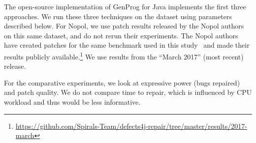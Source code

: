 \documentclass[conference]{IEEEtran}
\begin{document}
The open-source implementation of GenProg for
Java implements  
the first three approaches.   We run these three techniques on the dataset using
parameters described below.  For Nopol, we use patch results released
by the Nopol authors on this same dataset, and do not rerun their experiments.
The Nopol authors have created patches for the same benchmark used in
this study~\cite{martinez2016} and made their results publicly
available.\footnote{\url{https://github.com/Spirals-Team/defects4j-repair/tree/master/results/2017-march}}
We use results from the ``March 2017'' (most recent) release. 

For the comparative experiments, we look at expressive power (bugs repaired) and
patch quality.  We do not compare time to repair, which is influenced by CPU workload and thus would
be less informative.



\newcommand\mII[1]{\multicolumn{2}{c|}{#1}}
\end{document}
